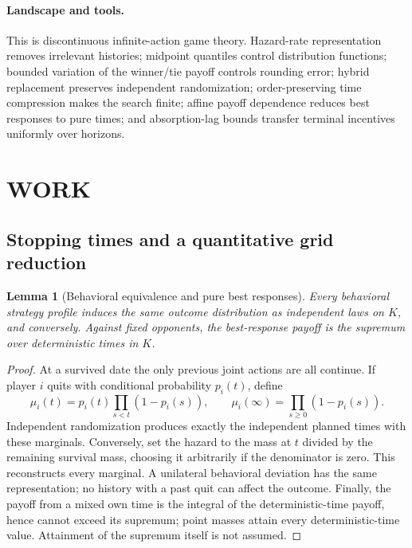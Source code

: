 \documentclass[11pt,a4paper]{article}
\newtheorem{lemma}[theorem]{Lemma}
\theoremstyle{definition}
\theoremstyle{remark}
\begin{document}
\paragraph{Landscape and tools.}
This is discontinuous infinite-action game theory. Hazard-rate representation removes irrelevant histories; midpoint quantiles control distribution functions; bounded variation of the winner/tie payoff controls rounding error; hybrid replacement preserves independent randomization; order-preserving time compression makes the search finite; affine payoff dependence reduces best responses to pure times; and absorption-lag bounds transfer terminal incentives uniformly over horizons.

\section{WORK}
\subsection{Stopping times and a quantitative grid reduction}
\begin{lemma}[Behavioral equivalence and pure best responses]
Every behavioral strategy profile induces the same outcome distribution as independent laws on $K$, and conversely. Against fixed opponents, the best-response payoff is the supremum over deterministic times in $K$.
\end{lemma}
\begin{proof}
At a survived date the only previous joint actions are all continue. If player $i$ quits with conditional probability $p_i(t)$, define
\[
 \mu_i(t)=p_i(t)\prod_{s<t}(1-p_i(s)),\qquad
 \mu_i(\infty)=\prod_{s\geq0}(1-p_i(s)).
\]
Independent randomization produces exactly the independent planned times with these marginals. Conversely, set the hazard to the mass at $t$ divided by the remaining survival mass, choosing it arbitrarily if the denominator is zero. This reconstructs every marginal. A unilateral behavioral deviation has the same representation; no history with a past quit can affect the outcome. Finally, the payoff from a mixed own time is the integral of the deterministic-time payoff, hence cannot exceed its supremum; point masses attain every deterministic-time value. Attainment of the supremum itself is not assumed.
\end{proof}
\end{document}

